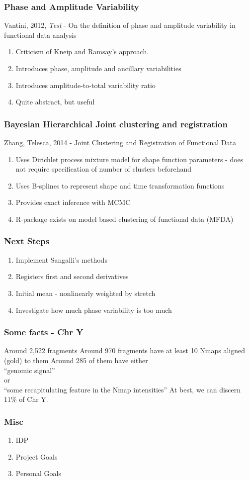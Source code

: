 \documentclass[10pt,dvipsnames,table, handout]{beamer} %
\begin{document}
\begin{frame}
\frametitle{Phase and Amplitude Variability}
Vantini, 2012, {\emph{Test}} - On the definition of phase and amplitude variability in functional data analysis
\begin{enumerate}
\item Criticism of Kneip and Ramsay's approach. 
\item Introduces phase, amplitude and ancillary variabilities
\item Introduces amplitude-to-total variability ratio
\item Quite abstract, but useful
\end{enumerate}
\end{frame}

\begin{frame}
\frametitle{Bayesian Hierarchical Joint clustering and registration}
Zhang, Telesca, 2014 - Joint Clustering and Registration of Functional Data
\begin{enumerate}
\item Uses Dirichlet process mixture model for shape function parameters - does not require specification of number of clusters beforehand
\item Uses B-splines to represent shape and time transformation functions
\item Provides exact inference with MCMC
\item R-package exists on model based clustering of functional data (MFDA)
\end{enumerate}
\end{frame}

\begin{frame}
\frametitle{Next Steps}
\begin{enumerate}
\item Implement Sangalli's methods
\item Registers first and second derivatives
\item Initial mean - nonlinearly weighted by stretch
\item Investigate how much phase variability is too much
\end{enumerate}
\end{frame}

\begin{frame}
\frametitle{Some facts - Chr Y}
Around 2,522 fragments
\vspace{1cm}
Around 970 fragments have at least 10 Nmaps aligned (gold) to them
\vspace{1cm}
Around 285 of them have either \\
``genomic signal'' \\ or \\ ``some recapitulating feature in the Nmap intensities''
\vspace{1cm}
At best, we can discern $11\%$ of Chr Y.
\end{frame}

\begin{frame}
\frametitle{Misc}
\begin{enumerate}
\item IDP
\vspace{2cm}
\item Project Goals
\vspace{2cm}
\item Personal Goals
\end{enumerate}
\end{frame}
\end{document}
